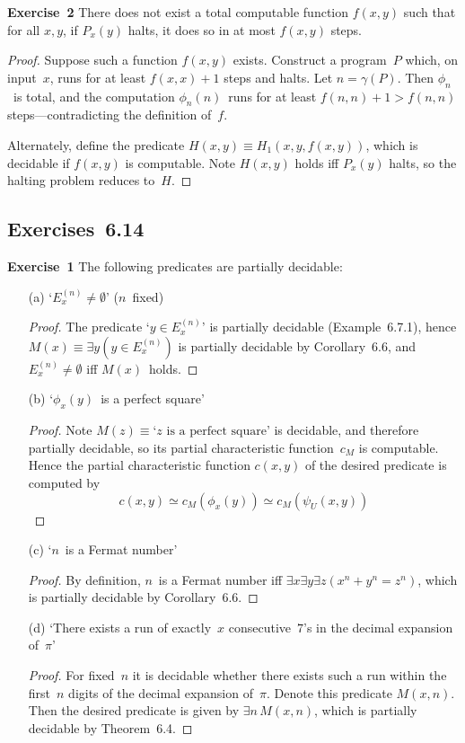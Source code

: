 \documentclass[letterpaper]{article}
\newcommand{\exercise}[2][]{\noindent\textbf{Exercise~{#2}}\ifthenelse{\isempty{#1}}{\textbf{.}}{ ({#1})\textbf{.}}}
\theoremstyle{plain}
\theoremstyle{definition}
\theoremstyle{remark}
\begin{document}
\exercise{2} There does not exist a total computable function $f(x,y)$ such that for all $x,y$, if $P_x(y)$ halts, it does so in at most $f(x,y)$ steps.
\begin{proof}
Suppose such a function $f(x,y)$ exists. Construct a program~$P$ which, on input~$x$, runs for at least $f(x,x)+1$ steps and halts. Let $n=\gamma(P)$. Then $\phi_n$~is total, and the computation $\phi_n(n)$~runs for at least $f(n,n)+1>f(n,n)$ steps---contradicting the definition of~$f$.

Alternately, define the predicate $H(x,y)\equiv H_1(x,y,f(x,y))$, which is decidable if $f(x,y)$ is computable. Note $H(x,y)$ holds iff $P_x(y)$ halts, so the halting problem reduces to~$H$.
\end{proof}

\subsection*{Exercises~6.14}
\exercise{1}
The following predicates are partially decidable:
\begin{enumerate}[itemsep=0pt]
\item[(a)] `$E_x^{(n)}\ne\emptyset$' ($n$~fixed)
\begin{proof}
The predicate `$y\in E_x^{(n)}$' is partially decidable (Example~6.7.1), hence $M(x)\equiv\exists y(y\in E_x^{(n)})$ is partially decidable by Corollary~6.6, and $E_x^{(n)}\ne\emptyset$ iff $M(x)$~holds.
\end{proof}
\item[(b)] `$\phi_x(y)$~is a perfect square'
\begin{proof}
Note $M(z)\equiv\text{`}z\text{ is a perfect square'}$ is decidable, and therefore partially decidable, so its partial characteristic function~$c_M$ is computable. Hence the partial characteristic function $c(x,y)$ of the desired predicate is computed by
$$c(x,y)\simeq c_M(\phi_x(y))\simeq c_M(\psi_U(x,y))$$
\end{proof}
\item[(c)] `$n$~is a Fermat number'
\begin{proof}
By definition, $n$~is a Fermat number iff $\exists x\exists y\exists z(x^n+y^n=z^n)$, which is partially decidable by Corollary~6.6.
\end{proof}
\item[(d)] `There exists a run of exactly~$x$ consecutive~$7$'s in the decimal expansion of~$\pi$'
\begin{proof}
For fixed~$n$ it is decidable whether there exists such a run within the first~$n$ digits of the decimal expansion of~$\pi$. Denote this predicate $M(x,n)$. Then the desired predicate is given by $\exists n\,M(x,n)$, which is partially decidable by Theorem~6.4.
\end{proof}
\end{enumerate}
\end{document}
